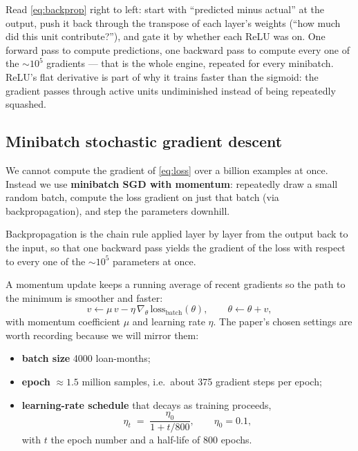 \documentclass[11pt]{article}
\begin{document}
\begin{intuition}
Read \eqref{eq:backprop} right to left: start with ``predicted minus actual'' at the output,
push it back through the transpose of each layer's weights (``how much did this unit
contribute?''), and gate it by whether each ReLU was on. One forward pass to compute
predictions, one backward pass to compute every one of the $\sim$$10^5$ gradients --- that
is the whole engine, repeated for every minibatch. ReLU's flat derivative is part of why it
trains faster than the sigmoid: the gradient passes through active units undiminished
instead of being repeatedly squashed.
\end{intuition}

\subsection{Minibatch stochastic gradient descent}

We cannot compute the gradient of \eqref{eq:loss} over a billion examples at once. Instead we
use \textbf{minibatch SGD with momentum}: repeatedly draw a small random batch, compute the
loss gradient on just that batch (via backpropagation), and step the parameters downhill.

\begin{jargon}
Backpropagation is the chain rule applied layer by layer from the output back to the input,
so that one backward pass yields the gradient of the loss with respect to every one of the
$\sim$$10^5$ parameters at once.
\end{jargon}

A momentum update keeps a running average of recent gradients so the path to the minimum is
smoother and faster:
\begin{equation}
  v \leftarrow \mu\, v - \eta\, \nabla_\theta\,\text{loss}_{\text{batch}}(\theta),
  \qquad
  \theta \leftarrow \theta + v,
  \label{eq:momentum}
\end{equation}
with momentum coefficient $\mu$ and learning rate $\eta$. The paper's chosen settings are
worth recording because we will mirror them:

\begin{itemize}[leftmargin=1.4em, itemsep=2pt]
  \item \textbf{batch size} 4000 loan-months;
  \item \textbf{epoch} $\approx 1.5$ million samples, i.e.\ about 375 gradient steps per
        epoch;
  \item \textbf{learning-rate schedule} that decays as training proceeds,
        \[
          \eta_t \;=\; \frac{\eta_0}{1 + t/800},
          \qquad \eta_0 = 0.1,
        \]
        with $t$ the epoch number and a half-life of 800 epochs.
\end{itemize}
\end{document}
